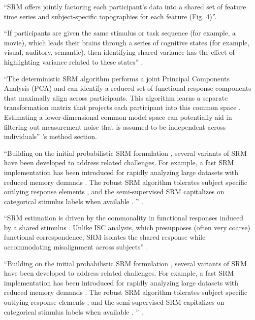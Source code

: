 %
``SRM offers jointly factoring each participant's data into a shared set of
feature time series and subject-specific topographies for each feature (Fig.
4)''\citep{cohen2017computational}.

%
``If participants are given the same stimulus or task sequence (for example, a
movie), which leads their brains through a series of cognitive states (for
example, visual, auditory, semantic), then identifying shared variance has the
effect of highlighting variance related to these states''
\citep{cohen2017computational}.

%
``The deterministic SRM algorithm performs a joint Principal Components Analysis
(PCA) and can identify a reduced set of functional response components that
maximally align across participants. This algorithm learns a separate
transformation matrix that projects each participant into this common space
\citep{chen2015reduced}. Estimating a lower-dimensional common model space can
potentially aid in filtering out measurement noise that is assumed to be
independent across individuals'' \citep{chang2021endogenous}'s method
section.

%
``Building on the initial probabilistic SRM formulation \citep{chen2015reduced,
anderson2016enabling}, several variants of SRM have been developed to address
related challenges. For example, a fast SRM implementation has been introduced
for rapidly analyzing large datasets with reduced memory demands
\citep{richard2019fast}. The robust SRM algorithm tolerates subject specific
outlying response elements \citep{turek2018capturing}, and the semi-supervised
SRM capitalizes on categorical stimulus labels when available
\citep{turek2017semi}. '' \citep{kumar2020brainiak}.

%
``SRM estimation is driven by the commonality in functional responses induced by
a shared stimulus . Unlike ISC analysis, which presupposes (often very coarse)
functional correspondence, SRM isolates the shared response while accommodating
misalignment across subjects'' \citep{kumar2020brainiak}.

%
``Building on the initial probabilistic SRM formulation \citep{chen2015reduced,
anderson2016enabling}, several variants of SRM have been developed to address
related challenges. For example, a fast SRM implementation has been introduced
for rapidly analyzing large datasets with reduced memory demands
\citep{richard2019fast}. The robust SRM algorithm tolerates subject specific
outlying response elements \citep{turek2018capturing}, and the semi-supervised
SRM capitalizes on categorical stimulus labels when available
\citep{turek2017semi}. '' \citep{kumar2020brainiak}.

